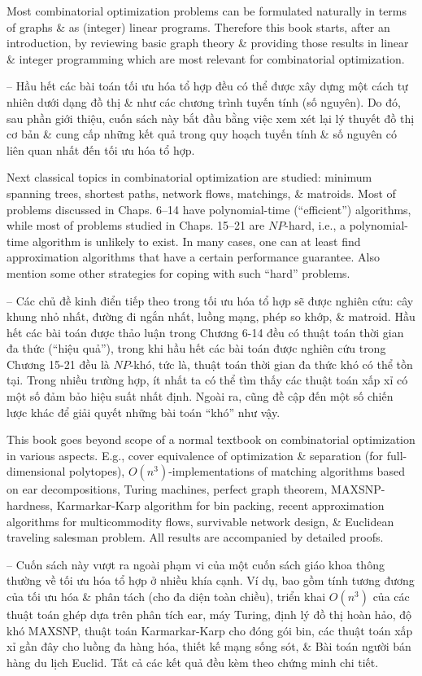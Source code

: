 \documentclass{article}
\begin{document}
\begin{itemize}
    Most combinatorial optimization problems can be formulated naturally in terms of graphs \& as (integer) linear programs. Therefore this book starts, after an introduction, by reviewing basic graph theory \& providing those results in linear \& integer programming which are most relevant for combinatorial optimization.

    -- Hầu hết các bài toán tối ưu hóa tổ hợp đều có thể được xây dựng một cách tự nhiên dưới dạng đồ thị \& như các chương trình tuyến tính (số nguyên). Do đó, sau phần giới thiệu, cuốn sách này bắt đầu bằng việc xem xét lại lý thuyết đồ thị cơ bản \& cung cấp những kết quả trong quy hoạch tuyến tính \& số nguyên có liên quan nhất đến tối ưu hóa tổ hợp.

    Next classical topics in combinatorial optimization are studied: minimum spanning trees, shortest paths, network flows, matchings, \& matroids. Most of problems discussed in Chaps. 6--14 have polynomial-time (``efficient'') algorithms, while most of problems studied in Chaps. 15--21 are $NP$-hard, i.e., a polynomial-time algorithm is unlikely to exist. In many cases, one can at least find approximation algorithms that have a certain performance guarantee. Also mention some other strategies for coping with such ``hard'' problems.

    -- Các chủ đề kinh điển tiếp theo trong tối ưu hóa tổ hợp sẽ được nghiên cứu: cây khung nhỏ nhất, đường đi ngắn nhất, luồng mạng, phép so khớp, \& matroid. Hầu hết các bài toán được thảo luận trong Chương 6-14 đều có thuật toán thời gian đa thức (``hiệu quả''), trong khi hầu hết các bài toán được nghiên cứu trong Chương 15-21 đều là $NP$-khó, tức là, thuật toán thời gian đa thức khó có thể tồn tại. Trong nhiều trường hợp, ít nhất ta có thể tìm thấy các thuật toán xấp xỉ có một số đảm bảo hiệu suất nhất định. Ngoài ra, cũng đề cập đến một số chiến lược khác để giải quyết những bài toán ``khó'' như vậy.

    This book goes beyond scope of a normal textbook on combinatorial optimization in various aspects. E.g., cover equivalence of optimization \& separation (for full-dimensional polytopes), $O(n^3)$-implementations of matching algorithms based on ear decompositions, Turing machines, perfect graph theorem, MAXSNP-hardness, Karmarkar-Karp algorithm for bin packing, recent approximation algorithms for multicommodity flows, survivable network design, \& Euclidean traveling salesman problem. All results are accompanied by detailed proofs.

    -- Cuốn sách này vượt ra ngoài phạm vi của một cuốn sách giáo khoa thông thường về tối ưu hóa tổ hợp ở nhiều khía cạnh. Ví dụ, bao gồm tính tương đương của tối ưu hóa \& phân tách (cho đa diện toàn chiều), triển khai $O(n^3)$ của các thuật toán ghép dựa trên phân tích ear, máy Turing, định lý đồ thị hoàn hảo, độ khó MAXSNP, thuật toán Karmarkar-Karp cho đóng gói bin, các thuật toán xấp xỉ gần đây cho luồng đa hàng hóa, thiết kế mạng sống sót, \& Bài toán người bán hàng du lịch Euclid. Tất cả các kết quả đều kèm theo chứng minh chi tiết.


\end{itemize}
\end{document}
